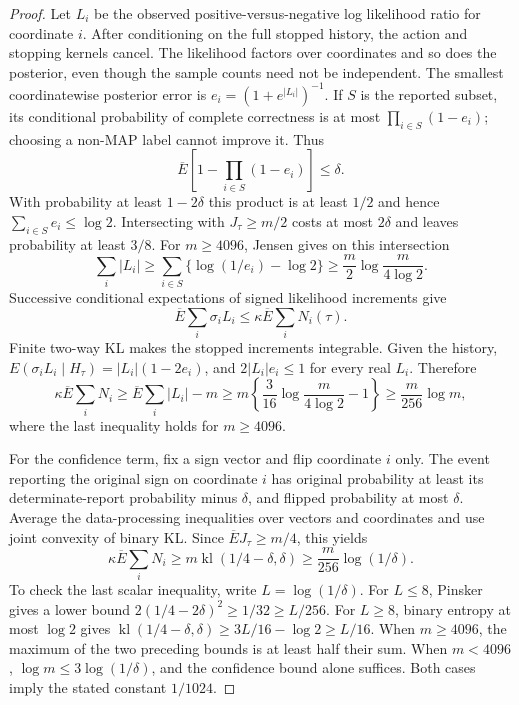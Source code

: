 \begin{proof}
Let $L_i$ be the observed positive-versus-negative log likelihood ratio for
coordinate $i$. After conditioning on the full stopped history, the action
and stopping kernels cancel. The likelihood factors over coordinates and so
does the posterior, even though the sample counts need not be independent.
The smallest coordinatewise posterior error is
$e_i=(1+e^{|L_i|})^{-1}$. If $S$ is the reported subset, its conditional
probability of complete correctness is at most $\prod_{i\in S}(1-e_i)$;
choosing a non-MAP label cannot improve it. Thus
\[
 \overline E\left[1-\prod_{i\in S}(1-e_i)\right]\le\delta.
\]
With probability at least $1-2\delta$ this product is at least $1/2$ and hence
$\sum_{i\in S}e_i\le\log2$. Intersecting with $J_\tau\ge m/2$ costs at most
$2\delta$ and leaves probability at least $3/8$. For $m\ge4096$, Jensen gives
on this intersection
\[
 \sum_i|L_i|\ge\sum_{i\in S}\{\log(1/e_i)-\log2\}
 \ge\frac m2\log\frac{m}{4\log2}.
\]
Successive conditional expectations of signed likelihood increments give
\[
 \overline E\sum_i\sigma_iL_i\le\kappa\overline E\sum_iN_i(\tau).
\]
Finite two-way KL makes the stopped increments integrable. Given the history,
$E(\sigma_iL_i\mid H_\tau)=|L_i|(1-2e_i)$, and
$2|L_i|e_i\le1$ for every real $L_i$. Therefore
\[
 \kappa\overline E\sum_iN_i\ge\overline E\sum_i|L_i|-m
 \ge m\left\{\frac3{16}\log\frac{m}{4\log2}-1\right\}
 \ge\frac m{256}\log m,
\]
where the last inequality holds for $m\ge4096$.

For the confidence term, fix a sign vector and flip coordinate $i$ only.
The event reporting the original sign on coordinate $i$ has original
probability at least its determinate-report probability minus $\delta$, and
flipped probability at most $\delta$. Average the data-processing inequalities
over vectors and coordinates and use joint convexity of binary KL.
Since $\overline EJ_\tau\ge m/4$, this yields
\[
 \kappa\overline E\sum_iN_i\ge
 m\operatorname{kl}(1/4-\delta,\delta)
 \ge\frac m{256}\log(1/\delta).
\]
To check the last scalar inequality, write $L=\log(1/\delta)$. For $L\le8$,
Pinsker gives a lower bound $2(1/4-2\delta)^2\ge1/32\ge L/256$.
For $L\ge8$, binary entropy at most $\log2$ gives
$\operatorname{kl}(1/4-\delta,\delta)\ge3L/16-\log2\ge L/16$.
When $m\ge4096$, the maximum of the two preceding bounds is at least half
their sum. When $m<4096$, $\log m\le3\log(1/\delta)$, and the confidence
bound alone suffices. Both cases imply the stated constant $1/1024$.
\end{proof}

